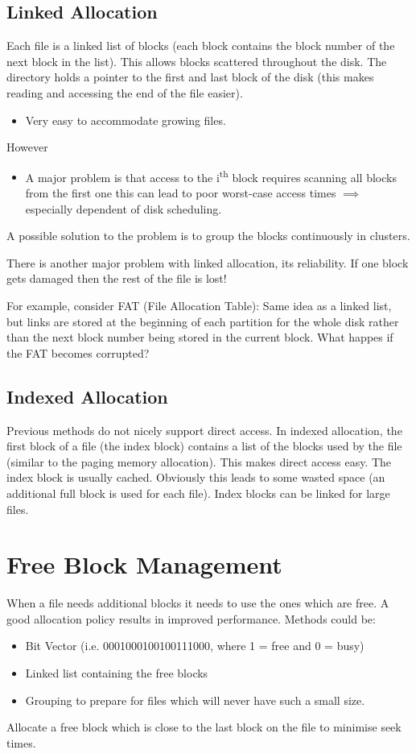 \documentclass[11pt]{article}
\begin{document}
\subsection{Linked Allocation}
\label{sec:org0469cd3}
Each file is a linked list of blocks (each block contains the block number of the next block in the list).
This allows blocks scattered throughout the disk.
The directory holds a pointer to the first and last block of the disk (this makes reading and accessing the end of the file easier).
\begin{itemize}
\item Very easy to accommodate growing files.
\end{itemize}
However
\begin{itemize}
\item A major problem is that access to the i\textsuperscript{th} block requires scanning all blocks from the first one this can lead to poor worst-case access times \(\implies\) especially dependent of disk scheduling.
\end{itemize}
A possible solution to the problem is to group the blocks continuously in clusters.

There is another major problem with linked allocation, its reliability.
If one block gets damaged then the rest of the file is lost!

For example, consider FAT (File Allocation Table):
Same idea as a linked list, but links are stored at the beginning of each partition for the whole disk rather than the next block number being stored in the current block.
What happes if the FAT becomes corrupted?

\subsection{Indexed Allocation}
\label{sec:orgf51d540}
Previous methods do not nicely support direct access.
In indexed allocation, the first block of a file (the index block) contains a list of the blocks used by the file (similar to the paging memory allocation).
This makes direct access easy.
The index block is usually cached.
Obviously this leads to some wasted space (an additional full block is used for each file).
Index blocks can be linked for large files.

\section{Free Block Management}
\label{sec:orgcc68fcf}
When a file needs additional blocks it needs to use the ones which are free.
A good allocation policy results in improved performance.
Methods could be:
\begin{itemize}
\item Bit Vector (i.e. 0001000100100111000, where 1 = free and 0 = busy)
\item Linked list containing the free blocks
\item Grouping to prepare for files which will never have such a small size.
\end{itemize}
Allocate a free block which is close to the last block on the file to minimise seek times.
\end{document}
